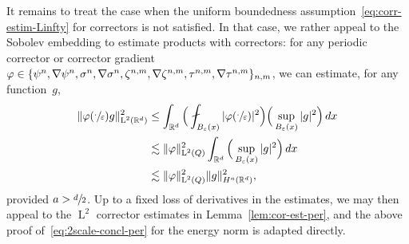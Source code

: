 \documentclass[JEP,XML,SOM,Unicode,published]{cedram}
\theoremstyle{plain}
\theoremstyle{definition}
\numberwithin{equation}{section}
\newcommand{\e}{\varepsilon}
\newcommand{\R}{\mathbb R}
\newcommand{\Ld}{\operatorname{L}}
\begin{document}
It remains to treat the case when the uniform boundedness assumption~\eqref{eq:corr-estim-Linfty} for correctors is not satisfied.
In that case, we rather appeal to the Sobolev embedding to estimate products with correctors: for any periodic corrector {or corrector gradient $\varphi\in\nobreak\{\psi^n,\nabla\psi^n,\sigma^n,\nabla\sigma^n,\zeta^{n,m},\nabla\zeta^{n,m},\tau^{n,m},\nabla\tau^{n,m}\}_{n,m}$}, we can estimate, for any function~$g$,
\begin{align}
\|\varphi(\sfrac\cdot\e) g\|_{\Ld^2(\R^d)}^2
&\le \int_{\R^d} \Big(\fint_{B_\e(x)} |\varphi(\sfrac\cdot\e)|^2\Big)\Big(\sup_{B_\e(x)} |g|^2\Big)\,dx\nonumber\\
&\lesssim\|\varphi\|_{\Ld^2(Q)}^2\int_{\R^d}\Big(\sup_{B_\e(x)} |g|^2\Big)\,dx\nonumber\\
&\lesssim\|\varphi\|_{\Ld^2(Q)}^2\|g\|_{H^a(\R^d)}^2,\label{eq:use-Sobolev-cor}
\end{align}
provided $a>\sfrac d2$.
Up to a fixed loss of derivatives in the estimates, we may then appeal to the $\Ld^2$ corrector estimates in Lemma~\ref{lem:cor-est-per}, and the above proof of~\eqref{eq:2scale-concl-per} for the energy norm is adapted directly.
\end{document}
